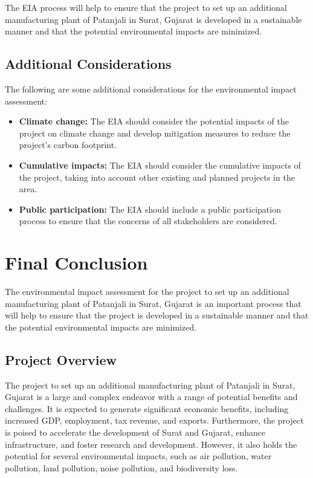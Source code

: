 The EIA process will help to ensure that the project to set up an additional manufacturing plant of Patanjali in Surat, Gujarat is developed in a sustainable manner and that the potential environmental impacts are minimized.

\subsection{Additional Considerations}
The following are some additional considerations for the environmental impact assessment:

\begin{itemize}
\item \textbf{Climate change:} The EIA should consider the potential impacts of the project on climate change and develop mitigation measures to reduce the project's carbon footprint.
\item \textbf{Cumulative impacts:} The EIA should consider the cumulative impacts of the project, taking into account other existing and planned projects in the area.
\item \textbf{Public participation:} The EIA should include a public participation process to ensure that the concerns of all stakeholders are considered.
\end{itemize}

\section{Final Conclusion}
The environmental impact assessment for the project to set up an additional manufacturing plant of Patanjali in Surat, Gujarat is an important process that will help to ensure that the project is developed in a sustainable manner and that the potential environmental impacts are minimized.

\subsection{Project Overview}
The project to set up an additional manufacturing plant of Patanjali in Surat, Gujarat is a large and complex endeavor with a range of potential benefits and challenges. It is expected to generate significant economic benefits, including increased GDP, employment, tax revenue, and exports. Furthermore, the project is poised to accelerate the development of Surat and Gujarat, enhance infrastructure, and foster research and development. However, it also holds the potential for several environmental impacts, such as air pollution, water pollution, land pollution, noise pollution, and biodiversity loss.

